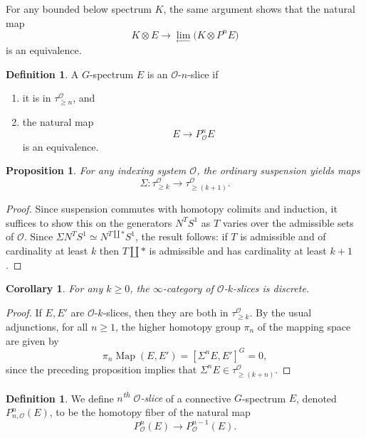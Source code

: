 \documentclass{amsart}
\DeclareMathOperator{\Map}{Map}
\newcommand{\cc}[1]{\mathcal #1}
\newcommand{\cO}{\cc{O}}
\numberwithin{equation}{section}
\newtheorem{corollary}[theorem]{Corollary}
\newtheorem{proposition}[theorem]{Proposition}
\theoremstyle{remark}
\theoremstyle{definition}
\newtheorem{definition}[theorem]{Definition}
\newcommand{\sma}{\otimes}
\newcommand{\htp}{\simeq}
\begin{document}
For any bounded below spectrum \(K\), the same argument shows that the natural map
\[
    K\sma E\to \lim_{\longleftarrow}\big(K\sma P^{n}E\big)
\]
is an equivalence. 

\begin{definition}
    A \(G\)-spectrum \(E\) is an \(\cO\)-\(n\)-slice if 
    \begin{enumerate}
        \item it is in \(\tau_{\geq n}^{\cO}\), and 
        \item the natural map
    \[
    E\to P^n_{\cO}E
    \]
    is an equivalence.
    \end{enumerate}
\end{definition}

\begin{proposition}
For any indexing system \(\cO\), the ordinary suspension yields maps
    \[
        \Sigma\colon\tau_{\geq k}^{\cO}\to\tau_{\geq (k+1)}^{\cO}.
    \]
\end{proposition}
\begin{proof}
    Since suspension commutes with homotopy colimits and induction, it suffices to show this on the generators \(N^T S^1\) as $T$ varies over the admissible sets of $\cO$.  Since $\Sigma N^{T} S^1 \htp N^{T\amalg \ast}S^1$, the result follows: if $T$ is admissible and of cardinality at least \(k\) then $T \amalg \ast$ is admissible and has cardinality at least $k+1$.
\end{proof}

\begin{corollary}
    For any \(k\geq 0\), the \(\infty\)-category of \(\cO\)-\(k\)-slices is discrete.
\end{corollary}
\begin{proof}
    If \(E,E'\) are \(\cO\)-\(k\)-slices, then they are both in \(\tau_{\geq k}^{\cO}\). By the usual adjunctions, for all \(n\geq 1\), the higher homotopy group \(\pi_n\) of the mapping space are given by
    \[
        \pi_n\Map(E,E')=[\Sigma^n E,E']^G=0,
    \]
    since the preceding proposition implies that \(\Sigma^n E\in\tau_{\geq (k+n)}^{\cO}\).
\end{proof}

\begin{definition}
We define {\emph{\(n\)\textsuperscript{th} \(\cO\)-slice}} of a connective \(G\)-spectrum \(E\), denoted \(P^n_{n,\cO}(E)\), to be the homotopy fiber of the natural map
\[
P^n_{\cO}(E)\to P^{n-1}_{\cO}(E).
\]
\end{definition}
\end{document}
